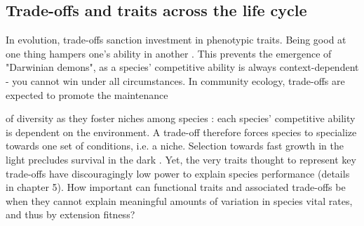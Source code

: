 \documentclass[b5paper,justified]{tufte-book} %
\begin{document}
\begin{fullwidth}
\subsection{Trade-offs and traits across the life cycle}
\end{fullwidth}
In evolution, trade-offs sanction investment in phenotypic traits. Being good at one thing hampers one's ability in another \citep{Stearns1992, Fabian2012}. This prevents the emergence of "Darwinian demons", as a species' competitive ability is always context-dependent - you cannot win under all circumstances. In community ecology, trade-offs are expected to promote the maintenance \begin{fullwidth} of diversity as they foster niches among species \citep{Chesson2000}: each species' competitive ability is dependent on the environment. A trade-off therefore forces species to specialize towards one set of conditions, i.e. a niche. Selection towards fast growth in the light precludes survival in the dark \citep{Gilbert2006, Wright2010, Sterck2011}. Yet, the very traits thought to represent key trade-offs have discouragingly low power to explain species performance (details in chapter 5). How important can functional traits and associated trade-offs be when they cannot explain meaningful amounts of variation in species vital rates, and thus by extension fitness? 


\end{fullwidth}
\end{document}
